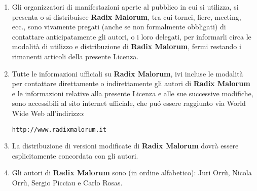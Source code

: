 \documentclass[10pt,italian,onecolumn,twoside,xdvi,openany,a4paper]{book}
\begin{document}
\begin{enumerate}
      \item Gli organizzatori di manifestazioni aperte al pubblico in
      cui si utilizza, si presenta o si distribuisce {\bf Radix
      Malorum}, tra cui tornei, fiere, meeting, ecc., sono vivamente
      pregati (anche se non formalmente obbligati) di contattare
      anticipatamente gli autori, o i loro delegati, per informarli
      circa le modalit\`a di utilizzo e distribuzione di {\bf Radix
      Malorum}, fermi restando i rimanenti articoli della presente
      Licenza.

      \item Tutte le informazioni ufficiali su {\bf Radix Malorum},
      ivi incluse le modalit\`a per contattare direttamente o
      indirettamente gli autori di {\bf Radix Malorum} e le
      informazioni relative alla presente Licenza e alle sue
      successive modifiche, sono accessibili al sito internet
      ufficiale, che pu\'o essere raggiunto via World Wide Web
      all'indirizzo:

      {\tt http://www.radixmalorum.it}

      \item La distribuzione di versioni modificate di {\bf Radix
      Malorum} dovr\`a essere esplicitamente concordata con gli
      autori.

      \item Gli autori di {\bf Radix Malorum} sono (in ordine
      alfabetico): Juri Orr\`u, Nicola Orr\`u, Sergio Picciau e Carlo
      Rosas.

      \end{enumerate} 
\end{document}
